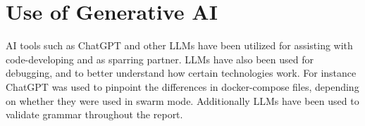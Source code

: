 \section{Use of Generative AI}

AI tools such as ChatGPT and other LLMs have been utilized for assisting with code-developing and as sparring partner. LLMs have also been used for debugging, and to better understand how certain technologies work. For instance ChatGPT was used to pinpoint the differences in docker-compose files, depending on whether they were used in swarm mode. Additionally LLMs have been used to validate grammar throughout the report.